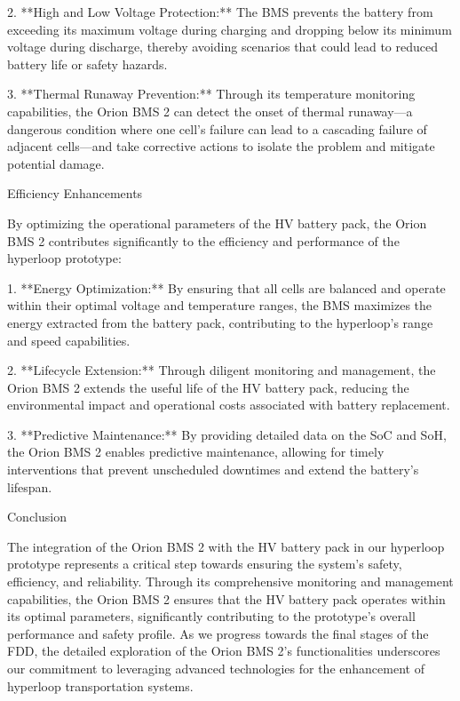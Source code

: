 2. **High and Low Voltage Protection:** The BMS prevents the battery from exceeding its maximum voltage during charging and dropping below its minimum voltage during discharge, thereby avoiding scenarios that could lead to reduced battery life or safety hazards.

3. **Thermal Runaway Prevention:** Through its temperature monitoring capabilities, the Orion BMS 2 can detect the onset of thermal runaway—a dangerous condition where one cell's failure can lead to a cascading failure of adjacent cells—and take corrective actions to isolate the problem and mitigate potential damage.

Efficiency Enhancements

By optimizing the operational parameters of the HV battery pack, the Orion BMS 2 contributes significantly to the efficiency and performance of the hyperloop prototype:

1. **Energy Optimization:** By ensuring that all cells are balanced and operate within their optimal voltage and temperature ranges, the BMS maximizes the energy extracted from the battery pack, contributing to the hyperloop's range and speed capabilities.

2. **Lifecycle Extension:** Through diligent monitoring and management, the Orion BMS 2 extends the useful life of the HV battery pack, reducing the environmental impact and operational costs associated with battery replacement.

3. **Predictive Maintenance:** By providing detailed data on the SoC and SoH, the Orion BMS 2 enables predictive maintenance, allowing for timely interventions that prevent unscheduled downtimes and extend the battery's lifespan.

Conclusion

The integration of the Orion BMS 2 with the HV battery pack in our hyperloop prototype represents a critical step towards ensuring the system's safety, efficiency, and reliability. Through its comprehensive monitoring and management capabilities, the Orion BMS 2 ensures that the HV battery pack operates within its optimal parameters, significantly contributing to the prototype's overall performance and safety profile. As we progress towards the final stages of the FDD, the detailed exploration of the Orion BMS 2's functionalities underscores our commitment to leveraging advanced technologies for the enhancement of hyperloop transportation systems.
\subsubsection{}


